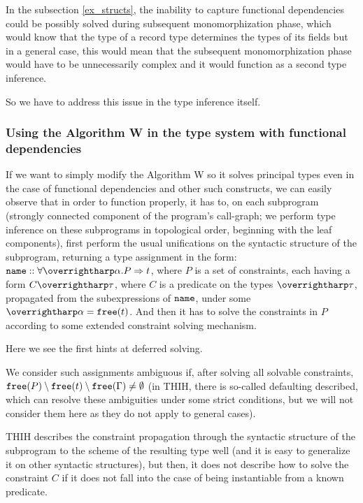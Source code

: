 In the subsection \ref{ex_structs}, the inability to capture functional dependencies could be possibly solved during subsequent monomorphization phase, which would know that the type of a record type determines the types of its fields but in a general case, this would mean that the subsequent monomorphization phase would have to be unnecessarily complex and it would function as a second type inference.

So we have to address this issue in the type inference itself.

\subsubsection*{Using the Algorithm W in the type system with functional dependencies}

If we want to simply modify the Algorithm W so it solves principal types even in the case of functional dependencies and other such constructs, we can easily observe that in order to function properly, it has to, on each subprogram (strongly connected component of the program's call-graph; we perform type inference on these subprograms in topological order, beginning with the leaf components), first perform the usual unifications on the syntactic structure of the subprogram, returning a type assignment in the form: $\mtt{name} :: \forall \vect \alpha . P  \To t$, where $P$ is a set of constraints, each having a form $C \vect \tau$, where $C$ is a predicate on the types $\vect \tau$, propagated from the subexpressions of $\mathtt{name}$, under some $\vect \alpha = \free t$. And then it has to solve the constraints in $P$ according to some extended constraint solving mechanism.

Here we see the first hints at deferred solving.

\begin{defn}
    We consider such assignments ambiguous if, after solving all solvable constraints, $\mathtt{free} (P) \setminus \mathtt{free} (t) \setminus \mathtt{free} (\Gamma) \neq \emptyset$ (in THIH, there is so-called defaulting described, which can resolve these ambiguities under some strict conditions, but we will not consider them here as they do not apply to general cases).
\end{defn}

THIH describes the constraint propagation through the syntactic structure of the subprogram to the scheme of the resulting type well (and it is easy to generalize it on other syntactic structures), but then, it does not describe how to solve the constraint $C$ if it does not fall into the case of being instantiable from a known predicate.

